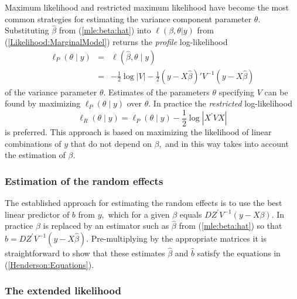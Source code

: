 \documentclass[12pt, a4paper]{article}
\begin{document}
Maximum likelihood and restricted maximum likelihood have become the most common strategies for estimating the variance component parameter $\theta.$ Substituting $\hat{\beta}$ from (\ref{mle:beta:hat}) into $\ell(\beta, \theta|y)$ from (\ref{Likelihood:MarginalModel}) returns the \emph{profile} log-likelihood
\begin{eqnarray*}
\ell_P(\theta \mid y) &=& \ell(\hat{\beta}, \theta \mid y) \\ 
&=& -\frac{1}{2} \log |V| -\frac{1}{2}(y - X \hat{\beta})'V^{-1}(y - X \hat{\beta})
\end{eqnarray*}
of the variance parameter $\theta.$ Estimates of the parameters $\theta$ specifying $V$ can be found by maximizing $\ell_P(\theta \mid y)$ over $\theta.$ In practice the \emph{restricted} log-likelihood
\[
\ell_R(\theta \mid y) =
\ell_P(\theta \mid y) -\frac{1}{2} \log |X^\prime VX |
\]
is preferred. This approach is based on maximizing the likelihood of linear combinations of $y$ that do not depend on $\beta,$ and in this way takes into account the estimation of $\beta.$


\subsubsection*{Estimation of the random effects}

The established approach for estimating the random effects is to use the best linear predictor of $b$ from $y,$ which for a given $\beta$ equals $DZ^\prime V^{-1}(y - X \beta).$ In practice $\beta$ is replaced by an estimator such as $\hat{\beta}$ from (\ref{mle:beta:hat}) so that $\hat{b} = DZ^\prime V^{-1}(y - X \hat{\beta}).$ Pre-multiplying by the appropriate matrices it is straightforward to show that these estimates $\hat{\beta}$ and $\hat{b}$ satisfy the equations in (\ref{Henderson:Equations}).


\subsubsection*{The extended likelihood}
\end{document}
